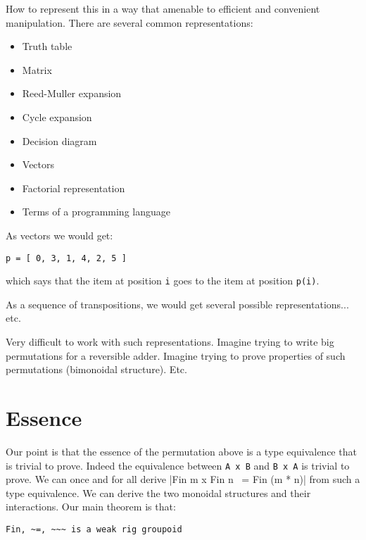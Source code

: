 \documentclass{llncs}
\begin{document}
How to represent this in a way that amenable to efficient and
convenient manipulation. There are several common representations:

\begin{itemize}
\item Truth table
\item Matrix
\item Reed-Muller expansion
\item Cycle expansion
\item Decision diagram
\item Vectors
\item Factorial representation
\item Terms of a programming language
\end{itemize}

As vectors we would get:
\begin{verbatim}
p = [ 0, 3, 1, 4, 2, 5 ]
\end{verbatim}
which says that the item at position \verb|i| goes to the item at
position \verb|p(i)|. 

As a sequence of transpositions, we would get several possible
representations... etc.

Very difficult to work with such representations. Imagine trying to
write big permutations for a reversible adder. Imagine trying to prove
properties of such permutations (bimonoidal structure). Etc.

\section{Essence}

Our point is that the essence of the permutation above is a type
equivalence that is trivial to prove. Indeed the equivalence between
\verb|A x B| and \verb|B x A| is trivial to prove. We can once and for
all derive |Fin m x Fin n ~= Fin (m * n)| from such a type
equivalence. We can derive the two monoidal structures and their
interactions. Our main theorem is that:
\begin{verbatim}
Fin, ~=, ~~~ is a weak rig groupoid
\end{verbatim}




\end{document}
